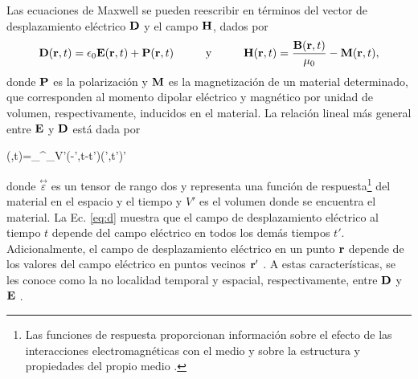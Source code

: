 \noindent Las ecuaciones de Maxwell se pueden reescribir en términos del vector de desplazamiento eléctrico $\vb{D}$ y el campo $\vb{H}$, dados por \cite{griffithsIntroductionElectrodynamics2023}
%
\begin{equation}
	\vb{D}(\vb{r},t)=\epsilon_0\vb{E}(\vb{r},t)+\vb{P}(\vb{r},t) \hspace{1cm}\text{y}\hspace{1cm}
	\vb{H}(\vb{r},t)=\frac{\vb{B}(\vb{r},t)}{\mu_0}-\vb{M}(\vb{r},t), \label{eq:D_H}
\end{equation}
%
donde $\vb{P}$ es la polarización y $\vb{M}$ es la magnetización de un material determinado, que corresponden al momento dipolar eléctrico y magnético por unidad de volumen, respectivamente, inducidos en el material. La relación lineal más general entre $\vb{E}$ y $\vb{D}$ está dada por \cite{jacksonClassicalElectrodynamics2021}
%
\begin{tcolorbox}
	(,t)=\int_{\infty}^{\infty}\int_{V'}\stackrel{\leftrightarrow}{\varepsilon}(-',t-t')\vdot{}(',t')'\
	\label{eq:d} 
\end{tcolorbox}
%	
\noindent donde $\stackrel{\leftrightarrow}{\varepsilon}$ es un tensor de rango dos y representa una función de respuesta\footnote{Las funciones de respuesta proporcionan información sobre el efecto de las interacciones electromagnéticas con el medio y sobre la estructura y propiedades del propio medio \cite{kirzhnitsGeneralPropertiesElectromagnetic1987}.} del material en el espacio y el tiempo \cite{jacksonClassicalElectrodynamics2021} y $V'$ es el volumen donde se encuentra el material. La Ec. \eqref{eq:d} muestra que el campo de desplazamiento eléctrico al tiempo $t$ depende del campo eléctrico en todos los demás tiempos $t'$. Adicionalmente, el campo de desplazamiento eléctrico en  un punto $\vb{r}$ depende de los valores del campo eléctrico en puntos vecinos $\vb{r}'$ \cite{jacksonClassicalElectrodynamics2021}. A estas características, se les conoce como la no localidad temporal y espacial, respectivamente, entre $\vb{D}$ y $\vb{E}$ \cite{jacksonClassicalElectrodynamics2021}.

